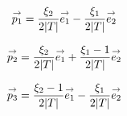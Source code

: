       \begin{minipage}{\textwidth}
        \begin{minipage}{0.329\textwidth}
            \begin{center}
              \begin{tikzpicture}[scale=1]
                
              \end{tikzpicture}
            \end{center}
            \begin{equation*}
              \vect{p_1}=\frac{\xi_2}{2|T|}\vect{e_1}-\frac{\xi_1}{2|T|}\vect{e_2}
            \end{equation*}
        \end{minipage}
        \begin{minipage}{0.329\textwidth}
            \begin{center}
              \begin{tikzpicture}[scale=1]
                
              \end{tikzpicture}
               \begin{equation*}
                \vect{p_2}= \frac{\xi_2}{2|T|}\vect{e_1} + \frac{\xi_1-1}{2|T|}\vect{e_2}
              \end{equation*}
            \end{center}
        \end{minipage}
        \begin{minipage}{0.329\textwidth}
            \begin{center}
              \begin{tikzpicture}[scale=1]
                
              \end{tikzpicture}
              \begin{equation*}
                \vect{p_3}= \frac{\xi_2-1}{2|T|}\vect{e_1} - \frac{\xi_1}{2|T|}\vect{e_2}
              \end{equation*}
            \end{center}
        \end{minipage}
        \label{fig:form_int:fon_base:p}
      \end{minipage}

